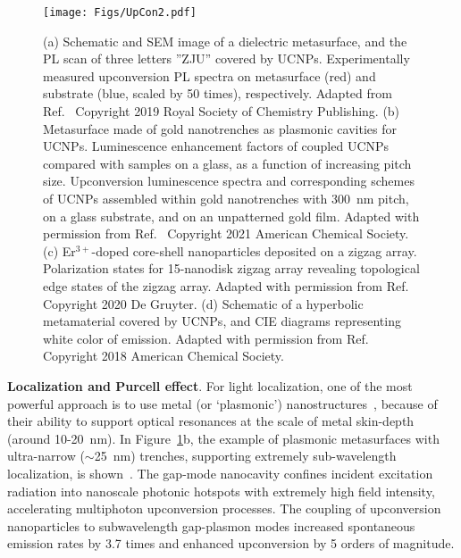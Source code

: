 \documentclass[journal=chreay,manuscript=review]{achemso}
\begin{document}
\begin{figure}
    \centering
    \texttt{[image: Figs/UpCon2.pdf]}
    \caption{
    (a) Schematic and SEM image of a dielectric metasurface, and the PL scan of three letters ''ZJU'' covered by UCNPs. Experimentally measured upconversion PL spectra on metasurface (red) and substrate (blue, scaled by 50 times), respectively. Adapted from Ref.~ Copyright 2019 Royal Society of Chemistry Publishing. (b) Metasurface made of gold nanotrenches as plasmonic cavities for UCNPs. Luminescence enhancement factors of coupled UCNPs compared with samples on a glass, as a function of increasing pitch size. Upconversion luminescence spectra and corresponding schemes of UCNPs assembled within gold nanotrenches with 300~nm pitch, on a glass substrate, and on an unpatterned gold film. Adapted with permission from Ref.~ Copyright 2021 American Chemical Society. (c) Er$^{3+}$-doped core-shell nanoparticles deposited on a zigzag array. Polarization states for 15-nanodisk zigzag array revealing topological edge states of the zigzag array. Adapted with permission from Ref.~ Copyright 2020 De Gruyter. (d) Schematic of a hyperbolic metamaterial covered by UCNPs, and CIE diagrams representing white color of emission. Adapted with permission from Ref.~ Copyright 2018 American Chemical Society.}
    \label{fig:upcon2}
\end{figure}

{\bf Localization and Purcell effect}. For light localization, one of the most powerful approach is to use metal (or `plasmonic') nanostructures~\cite{schuller2010plasmonics, jiang2017active, kravets2018plasmonic}, because of their ability to support optical resonances at the scale of metal skin-depth (around 10-20~nm). In Figure~\ref{fig:upcon2}b, the example of plasmonic metasurfaces with ultra-narrow ($\sim$25~nm) trenches, supporting extremely sub-wavelength localization, is shown~\cite{xu2021multiphoton}. The gap-mode nanocavity confines incident excitation radiation into nanoscale photonic hotspots with extremely high field intensity, accelerating multiphoton upconversion processes. The coupling of upconversion nanoparticles to subwavelength gap-plasmon modes increased spontaneous emission rates by 3.7 times and enhanced upconversion by 5 orders of magnitude. 
\end{document}
